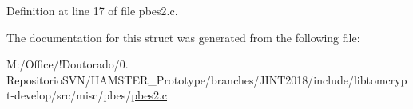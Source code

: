 Definition at line 17 of file pbes2.\+c.



The documentation for this struct was generated from the following file\+:\begin{DoxyCompactItemize}
\item 
M\+:/\+Office/!\+Doutorado/0. Repositorio\+S\+V\+N/\+H\+A\+M\+S\+T\+E\+R\+\_\+\+Prototype/branches/\+J\+I\+N\+T2018/include/libtomcrypt-\/develop/src/misc/pbes/\mbox{\hyperlink{pbes2_8c}{pbes2.\+c}}\end{DoxyCompactItemize}
